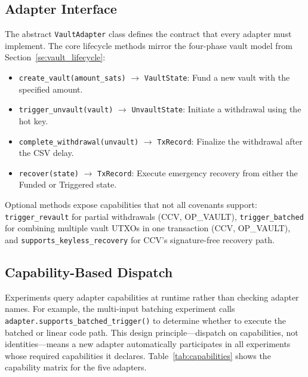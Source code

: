 \subsection{Adapter Interface} \label{ss:adapter_interface}

The abstract \texttt{VaultAdapter} class defines the contract that every adapter
must implement. The core lifecycle methods mirror the four-phase vault model from
Section~\ref{se:vault_lifecycle}:

\begin{itemize}
\item \texttt{create\_vault(amount\_sats)} $\rightarrow$ \texttt{VaultState}:
  Fund a new vault with the specified amount.
\item \texttt{trigger\_unvault(vault)} $\rightarrow$ \texttt{UnvaultState}:
  Initiate a withdrawal using the hot key.
\item \texttt{complete\_withdrawal(unvault)} $\rightarrow$ \texttt{TxRecord}:
  Finalize the withdrawal after the CSV delay.
\item \texttt{recover(state)} $\rightarrow$ \texttt{TxRecord}:
  Execute emergency recovery from either the Funded or Triggered state.
\end{itemize}

Optional methods expose capabilities that not all covenants support:
\texttt{trigger\_revault} for partial withdrawals (CCV, OP\_VAULT),
\texttt{trigger\_batched} for combining multiple vault UTXOs in one transaction
(CCV, OP\_VAULT), and \texttt{supports\_keyless\_recovery} for CCV's signature-free
recovery path.

\subsection{Capability-Based Dispatch} \label{ss:capability_dispatch}

Experiments query adapter capabilities at runtime rather than checking adapter names.
For example, the multi-input batching experiment calls
\texttt{adapter.supports\_batched\_trigger()} to determine whether to execute the
batched or linear code path. This design principle---dispatch on capabilities, not
identities---means a new adapter automatically participates in all experiments whose
required capabilities it declares. Table~\ref{tab:capabilities} shows the capability
matrix for the five adapters.


